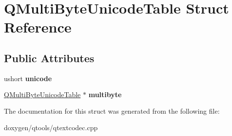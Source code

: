 \hypertarget{struct_q_multi_byte_unicode_table}{}\section{Q\+Multi\+Byte\+Unicode\+Table Struct Reference}
\label{struct_q_multi_byte_unicode_table}
\subsection*{Public Attributes}
\begin{DoxyCompactItemize}
\item 
\mbox{\label{struct_q_multi_byte_unicode_table_abab43b00ce1d66594312ba943f7b3e28}} 
ushort {\bfseries unicode}
\item 
\mbox{\label{struct_q_multi_byte_unicode_table_a7cd161119454ae4014c521cb04bbb68c}} 
\mbox{\hyperlink{struct_q_multi_byte_unicode_table}{Q\+Multi\+Byte\+Unicode\+Table}} $\ast$ {\bfseries multibyte}
\end{DoxyCompactItemize}


The documentation for this struct was generated from the following file\+:\begin{DoxyCompactItemize}
\item 
doxygen/qtools/qtextcodec.\+cpp\end{DoxyCompactItemize}
